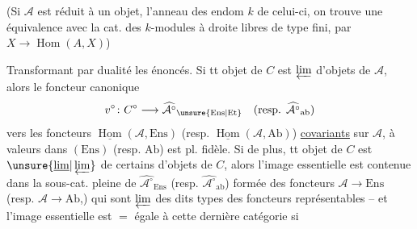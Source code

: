 (Si $\mathcal A$ est réduit à un objet,  l'anneau
des endom $k$ de celui-ci, on
trouve une équivalence avec la
cat. des $k$-modules à droite
libres de type fini, par $X\to\operatorname{Hom}(A,X)$)

Transformant par dualité les énoncés.
Si tt objet de $C$ est $\varprojlim$
d'objets de $\mathcal A$, alors le foncteur
canonique
\[
 v^{\circ}\colon C^{\circ}\longrightarrow \widehat{\mathcal A^{\circ}}_{\unsure{\mathrm{Ens}|\mathrm{Et}}}
 \quad(\text{resp. }\widehat{\mathcal A^{\circ}}_{\mathrm{ab}})
\]
vers les foncteurs $\underline{\operatorname{Hom}}(\mathcal A,\mathrm{Ens})$ (resp. $\underline{\operatorname{Hom}}(\mathcal A,\mathrm{Ab})$)
\uline{covariants} sur $\mathcal A$, à valeurs dans
$(\mathrm{Ens})$ (resp. $\mathrm{Ab}$) est pl. fidèle. Si
de plus, tt objet de $C$ est
$\unsure{\underline{\lim}|\varprojlim}$ de certains  d'objets
de $C$, alors l'image essentielle est
contenue dans la sous-cat. pleine
de $\widehat{\mathcal A^{\circ}}_{\mathrm{Ens}}$ (resp. $\widehat{\mathcal A^{\circ}}_{\mathrm{ab}}$) formée des
foncteurs $\mathcal A\to\mathrm{Ens}$ (resp. $\mathcal A\to\mathrm{Ab}$,)
qui sont $\varprojlim$ des dits types des
foncteurs représentables -- et
l'image essentielle est $=$ égale à
cette dernière catégorie si

